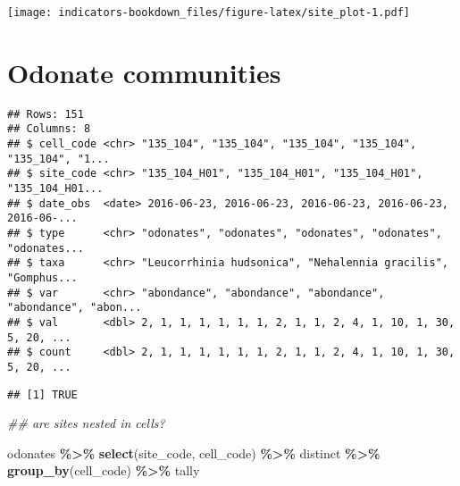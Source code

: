 \documentclass[
]{book}
\newenvironment{Shaded}{\begin{snugshade}}{\end{snugshade}}
\newcommand{\CommentTok}[1]{\textcolor[rgb]{0.56,0.35,0.01}{\textit{#1}}}
\newcommand{\KeywordTok}[1]{\textcolor[rgb]{0.13,0.29,0.53}{\textbf{#1}}}
\newcommand{\NormalTok}[1]{#1}
\newcommand{\OperatorTok}[1]{\textcolor[rgb]{0.81,0.36,0.00}{\textbf{#1}}}
\newcommand{\StringTok}[1]{\textcolor[rgb]{0.31,0.60,0.02}{#1}}
\begin{document}
\texttt{[image: indicators-bookdown\_files/figure-latex/site\_plot-1.pdf]}

\hypertarget{odonate-communities}{%
\chapter{Odonate communities}\label{odonate-communities}}

\begin{Shaded}
\end{Shaded}

\begin{verbatim}
## Rows: 151
## Columns: 8
## $ cell_code <chr> "135_104", "135_104", "135_104", "135_104", "135_104", "1...
## $ site_code <chr> "135_104_H01", "135_104_H01", "135_104_H01", "135_104_H01...
## $ date_obs  <date> 2016-06-23, 2016-06-23, 2016-06-23, 2016-06-23, 2016-06-...
## $ type      <chr> "odonates", "odonates", "odonates", "odonates", "odonates...
## $ taxa      <chr> "Leucorrhinia hudsonica", "Nehalennia gracilis", "Gomphus...
## $ var       <chr> "abondance", "abondance", "abondance", "abondance", "abon...
## $ val       <dbl> 2, 1, 1, 1, 1, 1, 1, 2, 1, 1, 2, 4, 1, 10, 1, 30, 5, 20, ...
## $ count     <dbl> 2, 1, 1, 1, 1, 1, 1, 2, 1, 1, 2, 4, 1, 10, 1, 30, 5, 20, ...
\end{verbatim}

\begin{verbatim}
## [1] TRUE
\end{verbatim}

\begin{Shaded}
\begin{Highlighting}[]
\CommentTok{\#\# are sites nested in cells? }

\NormalTok{odonates }\OperatorTok{\%\textgreater{}\%}\StringTok{ }
\StringTok{  }\KeywordTok{select}\NormalTok{(site\_code, cell\_code) }\OperatorTok{\%\textgreater{}\%}\StringTok{ }\NormalTok{distinct }\OperatorTok{\%\textgreater{}\%}\StringTok{ }
\StringTok{  }\KeywordTok{group\_by}\NormalTok{(cell\_code) }\OperatorTok{\%\textgreater{}\%}\StringTok{ }\NormalTok{tally}
\end{Highlighting}
\end{Shaded}
\end{document}
